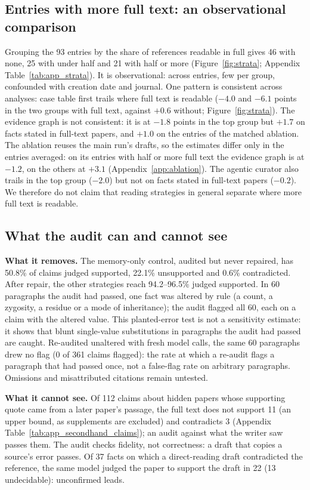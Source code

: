 \documentclass{article} %
\begin{document}
\subsection{Entries with more full text: an observational comparison}
\label{sec:strata}
Grouping the 93 entries by the share of references readable in full gives 46 with none, 25 with under half and 21 with half or more (Figure~\ref{fig:strata}; Appendix Table~\ref{tab:app_strata}). It is observational: across entries, few per group, confounded with creation date and journal. One pattern is consistent across analyses: case table first trails where full text is readable ($-4.0$ and $-6.1$ points in the two groups with full text, against $+0.6$ without; Figure~\ref{fig:strata}). The evidence graph is not consistent: it is at $-1.8$ points in the top group but $+1.7$ on facts stated in full-text papers, and $+1.0$ on the entries of the matched ablation. The ablation reuses the main run's drafts, so the estimates differ only in the entries averaged: on its entries with half or more full text the evidence graph is at $-1.2$, on the others at $+3.1$ (Appendix~\ref{app:ablation}). The agentic curator also trails in the top group ($-2.0$) but not on facts stated in full-text papers ($-0.2$). We therefore do not claim that reading strategies in general separate where more full text is readable.

\subsection{What the audit can and cannot see}
\label{sec:audit}
\textbf{What it removes.} The memory-only control, audited but never repaired, has 50.8\% of claims judged supported, 22.1\% unsupported and 0.6\% contradicted. After repair, the other strategies reach 94.2--96.5\% judged supported. In 60 paragraphs the audit had passed, one fact was altered by rule (a count, a zygosity, a residue or a mode of inheritance); the audit flagged all 60, each on a claim with the altered value. This planted-error test is not a sensitivity estimate: it shows that blunt single-value substitutions in paragraphs the audit had passed are caught. Re-audited unaltered with fresh model calls, the same 60 paragraphs drew no flag (0 of 361 claims flagged): the rate at which a re-audit flags a paragraph that had passed once, not a false-flag rate on arbitrary paragraphs. Omissions and misattributed citations remain untested.

\textbf{What it cannot see.} Of 112 claims about hidden papers whose supporting quote came from a later paper's passage, the full text does not support 11 (an upper bound, as supplements are excluded) and contradicts 3 (Appendix Table~\ref{tab:app_secondhand_claims}); an audit against what the writer saw passes them. The audit checks fidelity, not correctness: a draft that copies a source's error passes. Of 37 facts on which a direct-reading draft contradicted the reference, the same model judged the paper to support the draft in 22 (13 undecidable): unconfirmed leads.
\end{document}
